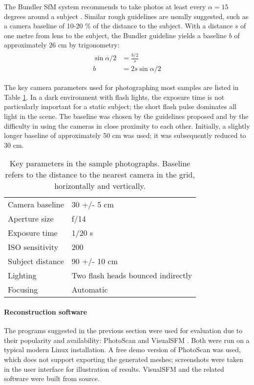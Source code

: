 The Bundler SfM system recommends to take photos at least every $\alpha = 15$ degrees around a subject \cite{bundlerfaq}.
Similar rough guidelines are usually suggested, such as a camera baseline of 10-20 \% of the distance to the subject.
With a distance $s$ of one metre from lens to the subject, the Bundler guideline yields a baseline $b$ of approximately 26 cm by trigonometry: %
\begin{align} \begin{split} \label{eq:baselinedegrees}
	\sin \alpha/2 &= \frac{b/2}{s}\\
	b &= 2 s \sin \alpha/2
\end{split} \end{align}

The key camera parameters used for photographing most samples are listed in Table \ref{tab:sampleshotparams}.
In a dark environment with flash lights, the exposure time is not particularly important for a static subject; the short flash pulse dominates all light in the scene.
The baseline was chosen by the guidelines proposed and by the difficulty in using the cameras in close proximity to each other.
Initially, a slightly longer baseline of approximately 50 cm was used; it was subsequently reduced to 30 cm.

\begin{table}[t]
	\centering
	\begin{tabular}{l l}
		Camera baseline & 30 +/- 5 cm\\
		Aperture size & f/14\\
		Exposure time & 1/20 s\\
		ISO sensitivity & 200\\
		Subject distance & 90 +/- 10 cm\\
		Lighting & Two flash heads bounced indirectly\\
		Focusing & Automatic\\
	\end{tabular}
	\caption{
		Key parameters in the sample photographs.
		Baseline refers to the distance to the nearest camera in the grid, horizontally and vertically.
	}
	\label{tab:sampleshotparams}
\end{table}

\paragraph{Reconstruction software}
The programs suggested in the previous section were used for evaluation due to their popularity and availability: PhotoScan \cite{photoscan} and VisualSFM \cite{wu2013towards}.
Both were run on a typical modern Linux installation.
A free demo version of PhotoScan was used, which does not support exporting the generated meshes; screenshots were taken in the user interface for illustration of results.
VisualSFM and the related software were built from source.


